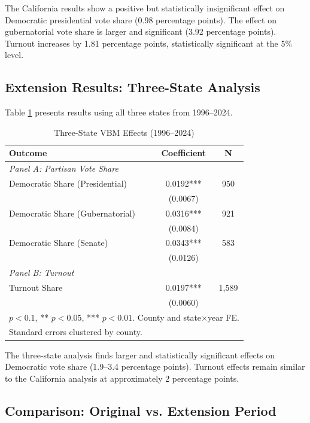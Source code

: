 \documentclass[12pt]{article}
\begin{document}
The California results show a positive but statistically insignificant effect on Democratic presidential vote share (0.98 percentage points). The effect on gubernatorial vote share is larger and significant (3.92 percentage points). Turnout increases by 1.81 percentage points, statistically significant at the 5\% level.

\subsection{Extension Results: Three-State Analysis}

Table \ref{tab:threestate} presents results using all three states from 1996--2024.

\begin{table}[H]
\centering
\caption{Three-State VBM Effects (1996--2024)}
\label{tab:threestate}
\begin{tabular}{lcc}
\toprule
Outcome & Coefficient & N \\
\midrule
\multicolumn{3}{l}{\textit{Panel A: Partisan Vote Share}} \\
Democratic Share (Presidential) & 0.0192*** & 950 \\
& (0.0067) & \\
Democratic Share (Gubernatorial) & 0.0316*** & 921 \\
& (0.0084) & \\
Democratic Share (Senate) & 0.0343*** & 583 \\
& (0.0126) & \\
\midrule
\multicolumn{3}{l}{\textit{Panel B: Turnout}} \\
Turnout Share & 0.0197*** & 1,589 \\
& (0.0060) & \\
\bottomrule
\multicolumn{3}{l}{\footnotesize * $p<0.1$, ** $p<0.05$, *** $p<0.01$. County and state$\times$year FE.} \\
\multicolumn{3}{l}{\footnotesize Standard errors clustered by county.} \\
\end{tabular}
\end{table}

The three-state analysis finds larger and statistically significant effects on Democratic vote share (1.9--3.4 percentage points). Turnout effects remain similar to the California analysis at approximately 2 percentage points.

\subsection{Comparison: Original vs. Extension Period}
\end{document}
